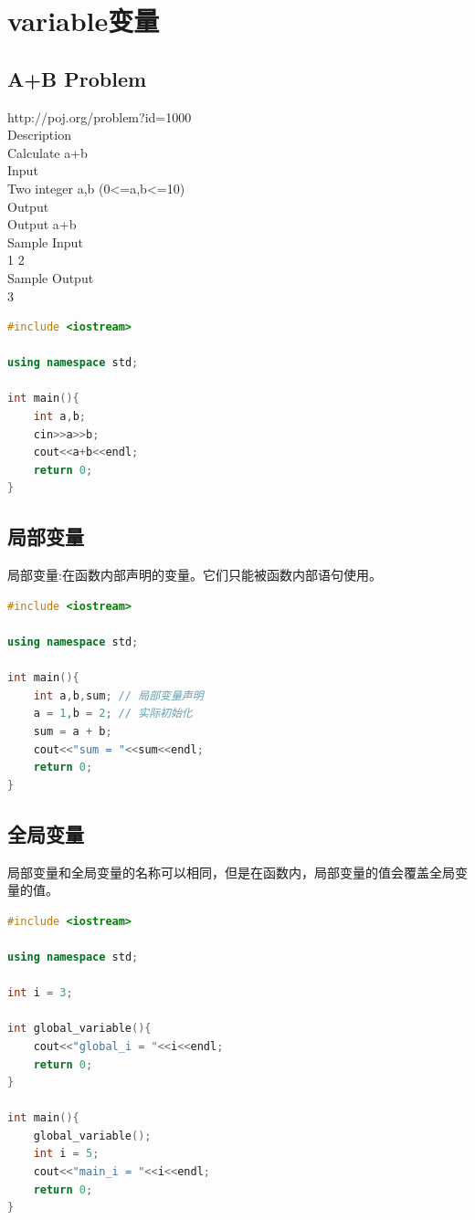 \documentclass[12pt,twiside,a4paper]{ctexbook}
\numberwithin{chapter}{part}
\begin{document}
\chapter{variable变量}
\section{A+B Problem}
http://poj.org/problem?id=1000\\
Description\\
Calculate a+b\\
Input\\
Two integer a,b (0<=a,b<=10)\\
Output\\
Output a+b\\
Sample Input\\
1 2\\
Sample Output\\
3
\begin{lstlisting}[language=C++]
#include <iostream>

using namespace std;

int main(){
	int a,b;
	cin>>a>>b;
	cout<<a+b<<endl;
	return 0;
}
\end{lstlisting}
\section{局部变量}
局部变量:在函数内部声明的变量。它们只能被函数内部语句使用。
\begin{lstlisting}[language=C++]
#include <iostream>

using namespace std;

int main(){
	int a,b,sum; // 局部变量声明
	a = 1,b = 2; // 实际初始化
	sum = a + b;
	cout<<"sum = "<<sum<<endl;
	return 0;
}
\end{lstlisting}

\section{全局变量}
局部变量和全局变量的名称可以相同，但是在函数内，局部变量的值会覆盖全局变量的值。
\begin{lstlisting}[language=C++]
#include <iostream>

using namespace std;

int i = 3;

int global_variable(){
	cout<<"global_i = "<<i<<endl;
	return 0;
}

int main(){
	global_variable();
	int i = 5;
	cout<<"main_i = "<<i<<endl;
	return 0;
}
\end{lstlisting}
\end{document}
